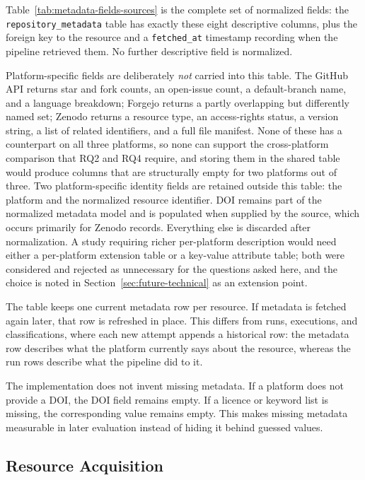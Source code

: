 Table~\ref{tab:metadata-fields-sources} is the complete set of normalized fields: the \texttt{repository\_metadata} table has exactly these eight descriptive columns, plus the foreign key to the resource and a \texttt{fetched\_at} timestamp recording when the pipeline retrieved them. No further descriptive field is normalized.

Platform-specific fields are deliberately \emph{not} carried into this table. The GitHub API returns star and fork counts, an open-issue count, a default-branch name, and a language breakdown; Forgejo returns a partly overlapping but differently named set; Zenodo returns a resource type, an access-rights status, a version string, a list of related identifiers, and a full file manifest. None of these has a counterpart on all three platforms, so none can support the cross-platform comparison that RQ2 and RQ4 require, and storing them in the shared table would produce columns that are structurally empty for two platforms out of three. Two platform-specific identity fields are retained outside this table: the platform and the normalized resource identifier. DOI remains part of the normalized metadata model and is populated when supplied by the source, which occurs primarily for Zenodo records. Everything else is discarded after normalization. A study requiring richer per-platform description would need either a per-platform extension table or a key-value attribute table; both were considered and rejected as unnecessary for the questions asked here, and the choice is noted in Section~\ref{sec:future-technical} as an extension point.

The table keeps one current metadata row per resource. If metadata is fetched again later, that row is refreshed in place. This differs from runs, executions, and classifications, where each new attempt appends a historical row: the metadata row describes what the platform currently says about the resource, whereas the run rows describe what the pipeline did to it.

The implementation does not invent missing metadata. If a platform does not provide a DOI, the DOI field remains empty. If a licence or keyword list is missing, the corresponding value remains empty. This makes missing metadata measurable in later evaluation instead of hiding it behind guessed values.

\subsection{Resource Acquisition}

